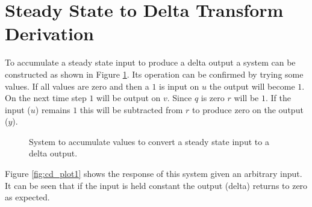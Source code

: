 \documentclass{article}
\begin{document}
\clearpage
\printbibliography[heading=bibintoc]

\clearpage
\appendix

\clearpage
\section{Steady State to Delta Transform Derivation}
\label{app:cdelta}

To accumulate a steady state input to produce a delta output
a system can be constructed as shown in Figure \ref{fig:cd1}.
Its operation can be confirmed by trying some values.
If all values are zero and then a $1$ is input on $u$ the
output will become $1$.
On the next time step $1$ will be output on $v$.
Since $q$ is zero $r$ will be $1$.
If the input ($u$) remains $1$ this will be subtracted from $r$
to produce zero on the output ($y$).

\begin{figure}[hpb!]
\begin{center}


\end{center}

\caption{System to accumulate values to convert a steady state
input to a delta output.}
\label{fig:cd1}
\end{figure}


Figure \ref{fig:cd_plot1} shows the response of this system given
an arbitrary input.
It can be seen that if the input is held constant the output (delta)
returns to zero as expected.
\end{document}
